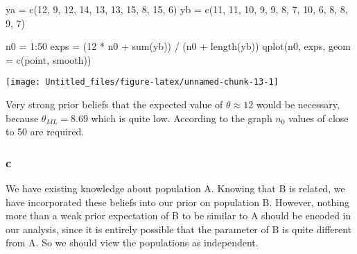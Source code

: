 \documentclass[
]{article}
\newenvironment{Shaded}{\begin{snugshade}}{\end{snugshade}}
\newcommand{\AttributeTok}[1]{\textcolor[rgb]{0.77,0.63,0.00}{#1}}
\newcommand{\DecValTok}[1]{\textcolor[rgb]{0.00,0.00,0.81}{#1}}
\newcommand{\FunctionTok}[1]{\textcolor[rgb]{0.00,0.00,0.00}{#1}}
\newcommand{\NormalTok}[1]{#1}
\newcommand{\OtherTok}[1]{\textcolor[rgb]{0.56,0.35,0.01}{#1}}
\newcommand{\SpecialCharTok}[1]{\textcolor[rgb]{0.00,0.00,0.00}{#1}}
\newcommand{\StringTok}[1]{\textcolor[rgb]{0.31,0.60,0.02}{#1}}
\begin{document}
\begin{Shaded}
\begin{Highlighting}[]
\NormalTok{ya }\OtherTok{=} \FunctionTok{c}\NormalTok{(}\DecValTok{12}\NormalTok{, }\DecValTok{9}\NormalTok{, }\DecValTok{12}\NormalTok{, }\DecValTok{14}\NormalTok{, }\DecValTok{13}\NormalTok{, }\DecValTok{13}\NormalTok{, }\DecValTok{15}\NormalTok{, }\DecValTok{8}\NormalTok{, }\DecValTok{15}\NormalTok{, }\DecValTok{6}\NormalTok{)}
\NormalTok{yb }\OtherTok{=} \FunctionTok{c}\NormalTok{(}\DecValTok{11}\NormalTok{, }\DecValTok{11}\NormalTok{, }\DecValTok{10}\NormalTok{, }\DecValTok{9}\NormalTok{, }\DecValTok{9}\NormalTok{, }\DecValTok{8}\NormalTok{, }\DecValTok{7}\NormalTok{, }\DecValTok{10}\NormalTok{, }\DecValTok{6}\NormalTok{, }\DecValTok{8}\NormalTok{, }\DecValTok{8}\NormalTok{, }\DecValTok{9}\NormalTok{, }\DecValTok{7}\NormalTok{)}

\NormalTok{n0 }\OtherTok{=} \DecValTok{1}\SpecialCharTok{:}\DecValTok{50}
\NormalTok{exps }\OtherTok{=}\NormalTok{ (}\DecValTok{12} \SpecialCharTok{*}\NormalTok{ n0 }\SpecialCharTok{+} \FunctionTok{sum}\NormalTok{(yb)) }\SpecialCharTok{/}\NormalTok{ (n0 }\SpecialCharTok{+} \FunctionTok{length}\NormalTok{(yb))}
\FunctionTok{qplot}\NormalTok{(n0, exps, }\AttributeTok{geom =} \FunctionTok{c}\NormalTok{(}\StringTok{\textquotesingle{}point\textquotesingle{}}\NormalTok{, }\StringTok{\textquotesingle{}smooth\textquotesingle{}}\NormalTok{))}
\end{Highlighting}
\end{Shaded}

\begin{center}\texttt{[image: Untitled\_files/figure-latex/unnamed-chunk-13-1]} \end{center}

Very strong prior beliefs that the expected value of
\(\theta \approx 12\) would be necessary, because \(\theta_{ML} = 8.69\)
which is quite low. According to the graph \(n_0\) values of close to 50
are required.

\hypertarget{c-1}{%
\subsubsection{c}\label{c-1}}

We have existing knowledge about population A. Knowing that B is
related, we have incorporated these beliefs into our prior on population
B. However, nothing more than a weak prior expectation of B to be
similar to A should be encoded in our analysis, since it is entirely
possible that the parameter of B is quite different from A. So we should
view the populations as independent.
\end{document}
